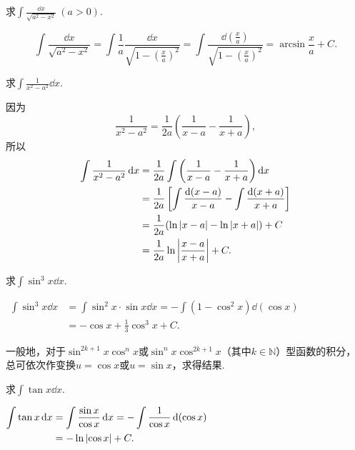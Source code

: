 \begin{example}
求\(\int \frac{\dd{x}}{\sqrt{a^2-x^2}}\ (a>0)\).
\begin{solution}
\[
\int \frac{\dd{x}}{\sqrt{a^2-x^2}}
= \int \frac{1}{a} \frac{\dd{x}}{\sqrt{1-\left(\frac{x}{a}\right)^2}}
= \int \frac{\dd(\frac{x}{a})}{\sqrt{1-\left(\frac{x}{a}\right)^2}}
= \arcsin\frac{x}{a} + C.
\]
\end{solution}
\end{example}

\begin{example}
求\(\int \frac{1}{x^2 - a^2} \dd{x}\).
\begin{solution}
因为\[
\frac{1}{x^2 - a^2} = \frac{1}{2a} \left(\frac{1}{x-a} - \frac{1}{x+a}\right),
\]所以\begin{align*}
\int \frac{1}{x^2 - a^2} \dd{x}
&= \frac{1}{2a} \int \left(\frac{1}{x-a} - \frac{1}{x+a}\right) \dd{x} \\
&= \frac{1}{2a} \left[ \int \frac{\dd(x-a)}{x-a} - \int \frac{\dd(x+a)}{x+a} \right] \\
&= \frac{1}{2a} ( \ln\abs{x-a} - \ln\abs{x+a} ) + C \\
&= \frac{1}{2a} \ln\abs{\frac{x-a}{x+a}} + C.
\end{align*}
\end{solution}
\end{example}

\begin{example}
求\(\int \sin^3 x \dd{x}\).
\begin{solution}
\(\begin{aligned}
	\int \sin^3 x \dd{x}
	&= \int \sin^2 x \cdot \sin x \dd{x}
	= -\int (1 - \cos^2 x) \dd(\cos x) \\
	&= -\cos x + \frac{1}{3} \cos^3 x + C.
\end{aligned}\)
\end{solution}
\end{example}

一般地，对于\(\sin^{2k+1} x \cos^n x\)或\(\sin^n x \cos^{2k+1} x\)（其中\(k\in\mathbb{N}\)）型函数的积分，总可依次作变换\(u = \cos x\)或\(u = \sin x\)，求得结果.

\begin{example}
求\(\int \tan x \dd{x}\).
\begin{solution}
\(\begin{aligned}
	\int \tan x \dd{x}
	&= \int \frac{\sin x}{\cos x} \dd{x}
	= - \int \frac{1}{\cos x} \dd(\cos x) \\
	&= - \ln\abs{\cos x} + C.
\end{aligned}\)
\end{solution}
\end{example}

